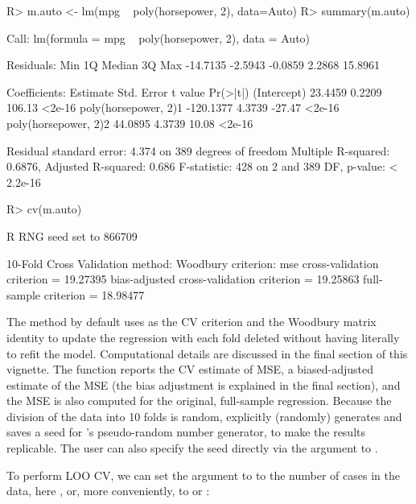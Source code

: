 \documentclass[
]{jss}
\begin{document}
\begin{CodeChunk}
\begin{CodeInput}
R> m.auto <- lm(mpg ~ poly(horsepower, 2), data=Auto)
R> summary(m.auto)
\end{CodeInput}
\begin{CodeOutput}

Call:
lm(formula = mpg ~ poly(horsepower, 2), data = Auto)

Residuals:
     Min       1Q   Median       3Q      Max 
-14.7135  -2.5943  -0.0859   2.2868  15.8961 

Coefficients:
                      Estimate Std. Error t value Pr(>|t|)
(Intercept)            23.4459     0.2209  106.13   <2e-16
poly(horsepower, 2)1 -120.1377     4.3739  -27.47   <2e-16
poly(horsepower, 2)2   44.0895     4.3739   10.08   <2e-16

Residual standard error: 4.374 on 389 degrees of freedom
Multiple R-squared:  0.6876,    Adjusted R-squared:  0.686 
F-statistic:   428 on 2 and 389 DF,  p-value: < 2.2e-16
\end{CodeOutput}
\begin{CodeInput}
R> cv(m.auto)
\end{CodeInput}
\begin{CodeOutput}
R RNG seed set to 866709
\end{CodeOutput}
\begin{CodeOutput}
10-Fold Cross Validation
method: Woodbury
criterion: mse
cross-validation criterion = 19.27395
bias-adjusted cross-validation criterion = 19.25863
full-sample criterion = 18.98477 
\end{CodeOutput}
\end{CodeChunk}

The  method by default uses  as the CV criterion
and the Woodbury matrix identity to update the regression with each fold
deleted without having literally to refit the model. Computational
details are discussed in the final section of this vignette. The
function reports the CV estimate of MSE, a biased-adjusted estimate of
the MSE (the bias adjustment is explained in the final section), and the
MSE is also computed for the original, full-sample regression. Because
the division of the data into 10 folds is random,  explicitly
(randomly) generates and saves a seed for 's pseudo-random
number generator, to make the results replicable. The user can also
specify the seed directly via the  argument to .

To perform LOO CV, we can set the  argument to  to
the number of cases in the data, here , or, more
conveniently, to  or :
\end{document}
